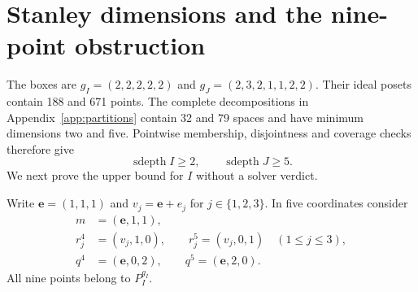 \documentclass[11pt,a4paper]{article}
\theoremstyle{remark}\newtheorem{remark}[theorem]{Remark}
\DeclareMathOperator{\sdepth}{sdepth}
\newcommand{\e}{\mathbf e}
\begin{document}
\section{Stanley dimensions and the nine-point obstruction}\label{sec:obstruction}
The boxes are $g_I=(2,2,2,2,2)$ and $g_J=(2,3,2,1,1,2,2)$. Their ideal posets contain 188 and 671 points. The complete decompositions in Appendix~\ref{app:partitions} contain 32 and 79 spaces and have minimum dimensions two and five. Pointwise membership, disjointness and coverage checks therefore give
\begin{equation}\label{eq:positive}
\sdepth I\ge2,\qquad \sdepth J\ge5.
\end{equation}
We next prove the upper bound for $I$ without a solver verdict.

Write $\e=(1,1,1)$ and $v_j=\e+e_j$ for $j\in\{1,2,3\}$. In five coordinates consider
\begin{equation}\label{eq:core}
\begin{split}
m&=(\e,1,1),\\
r_j^4&=(v_j,1,0),\qquad r_j^5=(v_j,0,1)\quad(1\le j\le3),\\
q^4&=(\e,0,2),\qquad q^5=(\e,2,0).
\end{split}
\end{equation}
All nine points belong to $P_I^{g_I}$.
\end{document}
